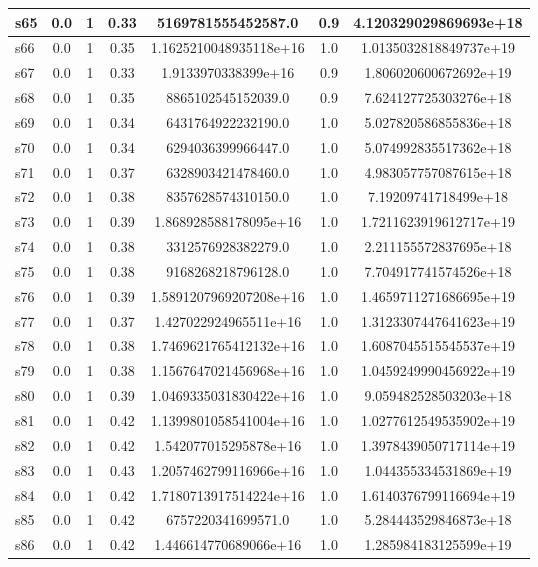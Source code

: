 \documentclass{article}
\begin{document}
\begin{tabular}{|l|c|c|c|c|c|c|}
\hline
s65 &0.0 & 1 & 0.33 & 5169781555452587.0 & 0.9 & 4.120329029869693e+18\\
\hline
s66 &0.0 & 1 & 0.35 & 1.1625210048935118e+16 & 1.0 & 1.0135032818849737e+19\\
\hline
s67 &0.0 & 1 & 0.33 & 1.9133970338399e+16 & 0.9 & 1.806020600672692e+19\\
\hline
s68 &0.0 & 1 & 0.35 & 8865102545152039.0 & 0.9 & 7.624127725303276e+18\\
\hline
s69 &0.0 & 1 & 0.34 & 6431764922232190.0 & 1.0 & 5.027820586855836e+18\\
\hline
s70 &0.0 & 1 & 0.34 & 6294036399966447.0 & 1.0 & 5.074992835517362e+18\\
\hline
s71 &0.0 & 1 & 0.37 & 6328903421478460.0 & 1.0 & 4.983057757087615e+18\\
\hline
s72 &0.0 & 1 & 0.38 & 8357628574310150.0 & 1.0 & 7.19209741718499e+18\\
\hline
s73 &0.0 & 1 & 0.39 & 1.868928588178095e+16 & 1.0 & 1.7211623919612717e+19\\
\hline
s74 &0.0 & 1 & 0.38 & 3312576928382279.0 & 1.0 & 2.211155572837695e+18\\
\hline
s75 &0.0 & 1 & 0.38 & 9168268218796128.0 & 1.0 & 7.704917741574526e+18\\
\hline
s76 &0.0 & 1 & 0.39 & 1.5891207969207208e+16 & 1.0 & 1.4659711271686695e+19\\
\hline
s77 &0.0 & 1 & 0.37 & 1.427022924965511e+16 & 1.0 & 1.3123307447641623e+19\\
\hline
s78 &0.0 & 1 & 0.38 & 1.7469621765412132e+16 & 1.0 & 1.6087045515545537e+19\\
\hline
s79 &0.0 & 1 & 0.38 & 1.1567647021456968e+16 & 1.0 & 1.0459249990456922e+19\\
\hline
s80 &0.0 & 1 & 0.39 & 1.0469335031830422e+16 & 1.0 & 9.059482528503203e+18\\
\hline
s81 &0.0 & 1 & 0.42 & 1.1399801058541004e+16 & 1.0 & 1.0277612549535902e+19\\
\hline
s82 &0.0 & 1 & 0.42 & 1.542077015295878e+16 & 1.0 & 1.3978439050717114e+19\\
\hline
s83 &0.0 & 1 & 0.43 & 1.2057462799116966e+16 & 1.0 & 1.044355334531869e+19\\
\hline
s84 &0.0 & 1 & 0.42 & 1.7180713917514224e+16 & 1.0 & 1.6140376799116694e+19\\
\hline
s85 &0.0 & 1 & 0.42 & 6757220341699571.0 & 1.0 & 5.284443529846873e+18\\
\hline
s86 &0.0 & 1 & 0.42 & 1.446614770689066e+16 & 1.0 & 1.285984183125599e+19\\

\end{tabular}
\end{document}
